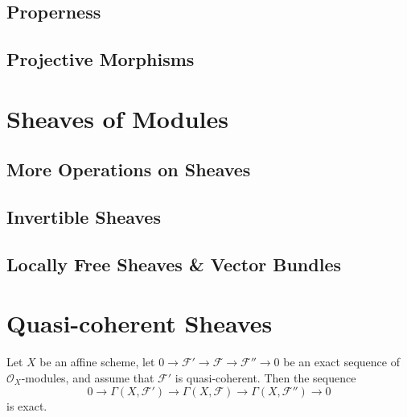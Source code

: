\documentclass[11pt]{article}
\begin{document}
\subsection{Properness}


\subsection{Projective Morphisms}





\section{Sheaves of Modules}

\subsection{More Operations on Sheaves}


\subsection{Invertible Sheaves}


\subsection{Locally Free Sheaves \& Vector Bundles}


\section{Quasi-coherent Sheaves}

\begin{proposition}
    \label{prop: exactness of global section functor on QCoh on affine}
    \cite[Proposition II.5.6]{hartsAG}
    Let $ X $ be an affine scheme, let $ 0 \to \mathscr{F}' \to \mathscr{F} \to \mathscr{F}'' \to 0 $ 
    be an exact sequence of $ \mathscr{O}_{X} $-modules, and assume that $ \mathscr{F}' $ is 
    quasi-coherent. Then the sequence 
    $$ 0 \to \Gamma(X,\mathscr{F}') \to \Gamma(X,\mathscr{F}) \to \Gamma(X,\mathscr{F}'') \to 0 $$
    is exact.  
\end{proposition}



\printbibliography
\end{document}
